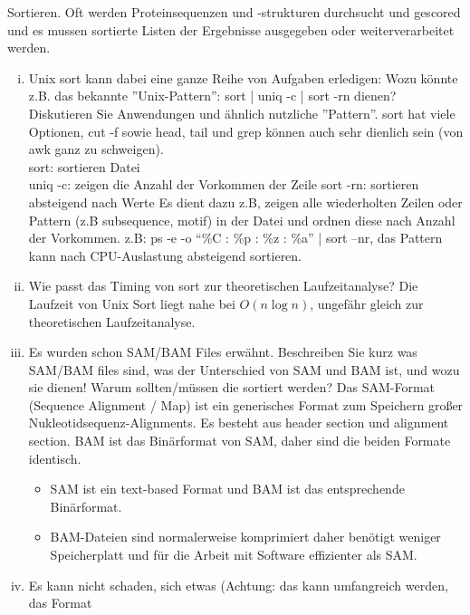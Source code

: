 \documentclass{article}
\begin{document}
\begin{flushleft}
Sortieren. Oft werden Proteinsequenzen und -strukturen durchsucht und gescored und es
mussen sortierte Listen der Ergebnisse ausgegeben oder weiterverarbeitet werden.
\begin{enumerate}[(i)]
    \item Unix sort kann dabei eine ganze Reihe von Aufgaben erledigen: Wozu könnte z.B. das
    bekannte ”Unix-Pattern”: sort | uniq -c | sort -rn dienen? Diskutieren Sie Anwendungen und ähnlich nutzliche ”Pattern”.
    sort hat viele Optionen, cut -f sowie head, tail und grep können auch sehr dienlich sein (von awk ganz zu schweigen).
    \newline \\
    sort: sortieren Datei \\
    uniq -c: zeigen die Anzahl der Vorkommen der Zeile
    sort -rn: sortieren absteigend nach Werte
    Es dient dazu z.B, zeigen alle wiederholten Zeilen oder Pattern (z.B subsequence, motif) in der Datei und ordnen diese nach Anzahl der Vorkommen. 
    \newline
    z.B: ps -e -o ``\%C : \%p : \%z : \%a'' | sort –nr, das Pattern kann nach CPU-Auslastung absteigend sortieren.
    \newpage
    \item Wie passt das Timing von sort zur theoretischen Laufzeitanalyse?
    \newline
    Die Laufzeit von Unix Sort liegt nahe bei $O(n\log n)$, ungefähr gleich zur theoretischen Laufzeitanalyse.
    \item Es wurden schon SAM/BAM Files erwähnt. Beschreiben Sie kurz was SAM/BAM files sind, was der Unterschied von 
    SAM und BAM ist, und wozu sie dienen! Warum sollten/müssen die sortiert werden? 
    \newline
    Das SAM-Format (Sequence Alignment / Map) ist ein generisches Format zum Speichern großer Nukleotidsequenz-Alignments. 
    Es besteht aus header section und alignment section. 
    BAM ist das Binärformat von SAM, daher sind die beiden Formate identisch.
    \begin{itemize}
        \item SAM ist ein text-based Format und BAM ist das entsprechende Binärformat.
        \item BAM-Dateien sind normalerweise komprimiert daher benötigt weniger Speicherplatt 
        und für die Arbeit mit Software effizienter als SAM.
    \end{itemize}
    \item Es kann nicht schaden, sich etwas (Achtung: das kann umfangreich werden, das Format

\end{enumerate}
\end{flushleft}
\end{document}
